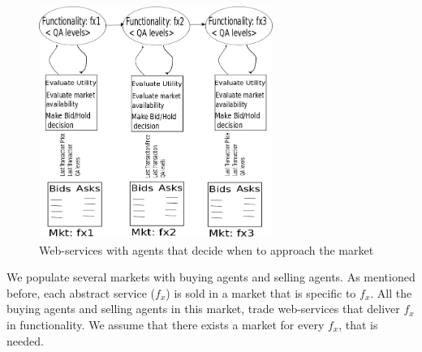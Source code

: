 \documentclass[10pt,journal,compsoc]{IEEEtran}
\begin{document}
\begin{figure} 
    \centering
    \includegraphics[width=3in, height=3in]{drawings/buyers-and-market.png}
  \caption{Web-services with agents that decide when to approach the market}
 \label{marketplace}
 \end{figure}
  

We populate several markets with buying agents and selling agents. As mentioned before, each abstract service ($f_{x}$) is sold in a market that is specific to $f_{x}$. All the buying agents and selling agents in this market, trade web-services that deliver $f_{x}$ in functionality. We assume that there exists a market for every $f_x$, that is needed.  
\end{document}
